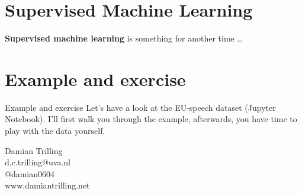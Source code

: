 \documentclass{beamer}
\begin{document}
\section*{Supervised Machine Learning}

\begin{frame}[plain]
	\textbf{Supervised machine learning} is something for another time \ldots
\end{frame}



\section{Example and exercise}
\begin{frame}{Example and exercise}
Let's have a look at the EU-speech dataset (Jupyter Notebook). I'll first walk you through the example, afterwards, you have time to play with the data yourself.
\end{frame}

\begin{frame}[plain]
	\huge
	\centering
	Damian Trilling\\ \vspace{0.5cm}
	d.c.trilling@uva.nl\\
	@damian0604\\
	www.damiantrilling.net\\
\end{frame}
\end{document}

